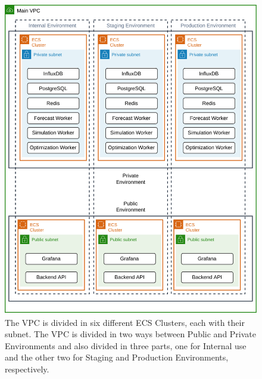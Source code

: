 \begin{figure}[!htbp]
    \centering
    \includegraphics[width=1\textwidth]{img/diagrams/pdf/final-arch-networking.drawio.pdf}
    \caption[Main VPC Diagram]{The VPC is divided in six different ECS Clusters, each with their subnet. The VPC is divided in two ways between Public and Private Environments and also divided in three parts, one for Internal use and the other two for Staging and Production Environments, respectively.}
    \label{fig:final-arch-networking}
\end{figure}
